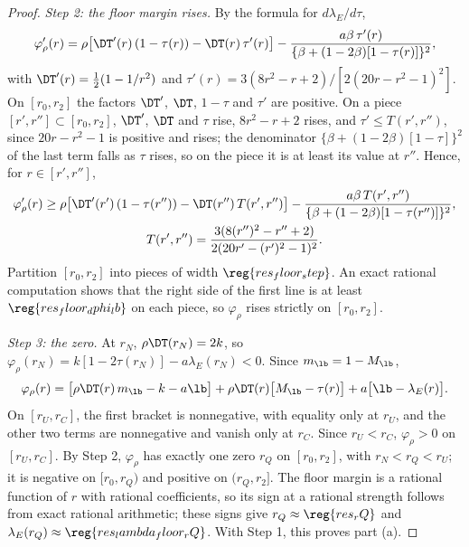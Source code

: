 \begin{proof}
\emph{Step 2: the floor margin rises.} By the formula for \(d\lambda_E/d\tau\),
\[
\varphi_\rho'(r)=\rho\bigl[\DT'(r)\,(1-\tau(r))-\DT(r)\,\tau'(r)\bigr]
-\frac{a\beta\,\tau'(r)}{\{\beta+(1-2\beta)[1-\tau(r)]\}^2},
\]
with \(\DT'(r)=\tfrac12(1-1/r^2)\) and \(\tau'(r)=3(8r^2-r+2)/[2(20r-r^2-1)^2]\). On \([r_0,r_2]\) the factors
\(\DT'\), \(\DT\), \(1-\tau\) and \(\tau'\) are positive. On a piece \([r',r'']\subset[r_0,r_2]\), \(\DT'\), \(\DT\)
and \(\tau\) rise, \(8r^2-r+2\) rises, and \(\tau'\le T(r',r'')\), since \(20r-r^2-1\) is positive and rises; the
denominator \(\{\beta+(1-2\beta)[1-\tau]\}^2\) of the last term falls as \(\tau\) rises, so on the piece it is at
least its value at \(r''\). Hence, for \(r\in[r',r'']\),
\begin{gather*}
\varphi_\rho'(r)\ge\rho\bigl[\DT'(r')\,(1-\tau(r''))-\DT(r'')\,T(r',r'')\bigr]
-\frac{a\beta\,T(r',r'')}{\{\beta+(1-2\beta)[1-\tau(r'')]\}^2},\\
T(r',r'')=\frac{3(8(r'')^2-r''+2)}{2(20r'-(r')^2-1)^2}.
\end{gather*}
Partition \([r_0,r_2]\) into pieces of width \(\reg{res_floor_step}\). An exact rational computation shows that the
right side of the first line is at least \(\reg{res_floor_dphi_lb}\) on each piece, so \(\varphi_\rho\) rises
strictly on \([r_0,r_2]\).

\emph{Step 3: the zero.} At \(r_N\), \(\rho\DT(r_N)=2k\), so \(\varphi_\rho(r_N)=k[1-2\tau(r_N)]-a\lambda_E(r_N)<0\).
Since \(m_{\lb}=1-M_{\lb}\),
\[
\varphi_\rho(r)=\bigl[\rho\DT(r)\,m_{\lb}-k-a\lb\bigr]+\rho\DT(r)\bigl[M_{\lb}-\tau(r)\bigr]+a\bigl[\lb-\lambda_E(r)\bigr].
\]
On \([r_U,r_C]\), the first bracket is nonnegative, with equality only at \(r_U\), and the other two terms are
nonnegative and vanish only at \(r_C\). Since \(r_U<r_C\), \(\varphi_\rho>0\) on \([r_U,r_C]\). By Step 2,
\(\varphi_\rho\) has exactly one zero \(r_Q\) on \([r_0,r_2]\), with \(r_N<r_Q<r_U\); it is negative on \([r_0,r_Q)\)
and positive on \((r_Q,r_2]\). The floor margin is a rational function of \(r\) with rational coefficients, so its
sign at a rational strength follows from exact rational arithmetic; these signs give \(r_Q\approx\reg{res_rQ}\) and
\(\lambda_E(r_Q)\approx\reg{res_lambda_floor_rQ}\). With Step 1, this proves part (a).


\end{proof}
